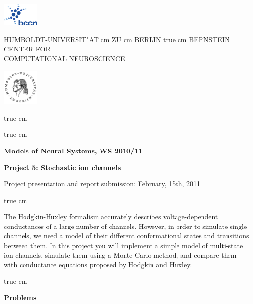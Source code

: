 \documentclass[12pt]{article}
\begin{document}
\parbox{2cm}{
\includegraphics[width=1.8cm]{bccnlogo.pdf}
}
\parbox{11cm}{
\begin{center}
\large HUMBOLDT-UNIVERSIT"AT  cm ZU  cm BERLIN
 true cm
\mgross BERNSTEIN CENTER FOR\\ COMPUTATIONAL NEUROSCIENCE
\end{center}
}
\parbox{2cm}
{
\hfill
\includegraphics[width=1.8cm]{hublogo.pdf}
}

 true cm



 true cm
\centerline{\bf Models of Neural Systems, WS 2010/11}
\centerline{\bf Project 5: Stochastic ion channels}
\centerline{Project presentation and report submission: February, 15th, 2011}

 true cm

The Hodgkin-Huxley formalism accurately describes voltage-dependent
conductances of a large number of channels. However, in order to
simulate single channels, we need a model of their different conformational
states and transitions between them. In this project you will
implement a simple model of multi-state ion channels, simulate them
using a Monte-Carlo method, and compare them with conductance equations
proposed by Hodgkin and Huxley.

 true cm

{\bf Problems}
\end{document}
